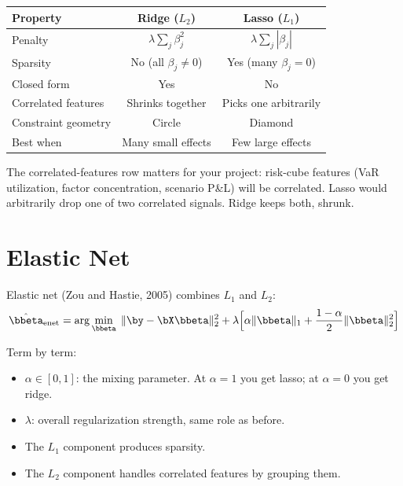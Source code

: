\begin{center}
\begin{tabular}{lcc}
\toprule
\textbf{Property} & \textbf{Ridge ($L_2$)} & \textbf{Lasso ($L_1$)} \\
\midrule
Penalty & $\lambda \sum_j \beta_j^2$ & $\lambda \sum_j |\beta_j|$ \\
Sparsity & No (all $\beta_j \neq 0$) & Yes (many $\beta_j = 0$) \\
Closed form & Yes & No \\
Correlated features & Shrinks together & Picks one arbitrarily \\
Constraint geometry & Circle & Diamond \\
Best when & Many small effects & Few large effects \\
\bottomrule
\end{tabular}
\end{center}

The correlated-features row matters for your project: risk-cube features (VaR utilization, factor concentration, scenario P\&L) will be correlated.
Lasso would arbitrarily drop one of two correlated signals.
Ridge keeps both, shrunk.

\section{Elastic Net}
\label{sec:elastic-net}

Elastic net (Zou and Hastie, 2005) combines $L_1$ and $L_2$:
\begin{equation}
\hat{\bbeta}_{\mathrm{enet}} = \arg\min_{\bbeta} \; \| \by - \bX\bbeta \|_2^2 + \lambda \Big[ \alpha \|\bbeta\|_1 + \frac{1-\alpha}{2} \|\bbeta\|_2^2 \Big]
\label{eq:elastic-net}
\end{equation}

Term by term:
\begin{itemize}[nosep]
  \item $\alpha \in [0,1]$: the mixing parameter. At $\alpha = 1$ you get lasso; at $\alpha = 0$ you get ridge.
  \item $\lambda$: overall regularization strength, same role as before.
  \item The $L_1$ component produces sparsity.
  \item The $L_2$ component handles correlated features by grouping them.
\end{itemize}

